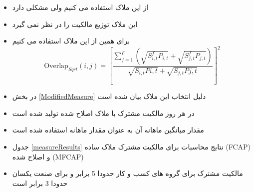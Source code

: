 \documentclass[12pt, a4paper]{article}
\begin{document}
\begin{itemize}
	
	\item 
	از این ملاک استفاده می کنیم ولی مشکلی دارد
	\item 
	این ملاک توزیع مالکیت را در نظر نمی گیرد
		\item 
		برای همین از این ملاک استفاده می کنیم
		\begin{equation}
			\text{Overlap}_{Sqrt}(i, j) =  [\frac{\sum_{f =1}^{F}(\sqrt{S^f_{i,t}P_{i,t}}+\sqrt{S^f_{j,t}P_{j,t}})}{\sqrt{S_{i,t}P{i,t}} + \sqrt{S_{j,t}P{j,t}}}]^2 
			\label{sqrt0}
		\end{equation}
		\item
		در بخش 
		\ref{ModifiedMeasure}
		دلیل انتخاب این ملاک بیان شده است
\end{itemize}

\begin{LTR}

\end{LTR}




\begin{itemize}
	\item 
	در هر روز مالکیت مشترک با ملاک اصلاح شده تولید شده است
	\item 
مقدار میانگین ماهانه آن به عنوان مقدار ماهانه استفاده شده است
	\item 
جدول 
\ref{measureResults}
نتایج محاسبات برای مالکیت مشترک ملاک ساده 
(FCAP)
و اصلاح شده
(MFCAP)
\begin{LTR}
\end{LTR}
\item
مالکیت مشترک برای گروه های کسب و کار حدودا 5 برابر و برای صنعت یکسان حدودا 3 برابر است
\end{itemize}

  \FloatBarrier
\end{document}
